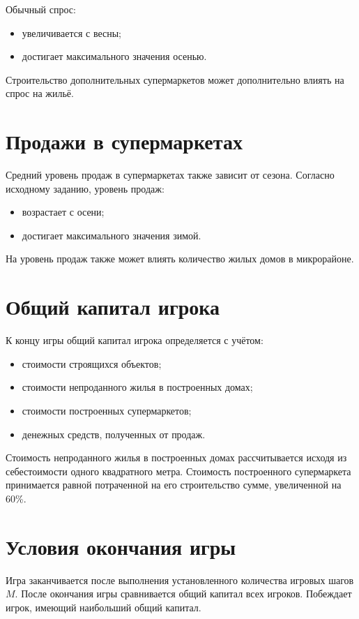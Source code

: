 \documentclass[a4paper,12pt]{article}
\begin{document}
Обычный спрос:
\begin{itemize}
    \item увеличивается с весны;
    \item достигает максимального значения осенью.
\end{itemize}

Строительство дополнительных супермаркетов может дополнительно влиять на спрос на жильё.

\section{Продажи в супермаркетах}

Средний уровень продаж в супермаркетах также зависит от сезона.
Согласно исходному заданию, уровень продаж:
\begin{itemize}
    \item возрастает с осени;
    \item достигает максимального значения зимой.
\end{itemize}

На уровень продаж также может влиять количество жилых домов в микрорайоне.

\section{Общий капитал игрока}

К концу игры общий капитал игрока определяется с учётом:
\begin{itemize}
    \item стоимости строящихся объектов;
    \item стоимости непроданного жилья в построенных домах;
    \item стоимости построенных супермаркетов;
    \item денежных средств, полученных от продаж.
\end{itemize}

Стоимость непроданного жилья в построенных домах рассчитывается исходя из себестоимости одного квадратного метра.
Стоимость построенного супермаркета принимается равной потраченной на его строительство сумме, увеличенной на 60\%.

\section{Условия окончания игры}

Игра заканчивается после выполнения установленного количества игровых шагов $M$.
После окончания игры сравнивается общий капитал всех игроков.
Побеждает игрок, имеющий наибольший общий капитал.
\end{document}
